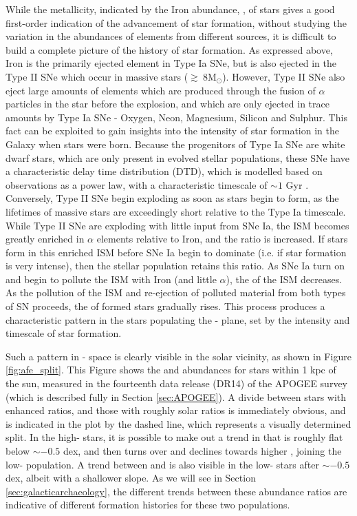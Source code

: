 While the metallicity, indicated by the Iron abundance, \feh{}, of stars gives a good first-order indication of the advancement of star formation, without studying the variation in the abundances of elements from different sources, it is difficult to build a complete picture of the history of star formation. As expressed above, Iron is the primarily ejected element in Type Ia SNe, but is also ejected in the Type II SNe which occur in massive stars ($\gtrsim \ 8 \mathrm{M_{\odot}}$). However, Type II SNe also eject large amounts of elements which are produced through the fusion of $\alpha$ particles in the star before the explosion, and which are only ejected in trace amounts by Type Ia SNe - Oxygen, Neon, Magnesium, Silicon and Sulphur. This fact can be exploited to gain insights into the intensity of star formation in the Galaxy when stars were born. Because the progenitors of Type Ia SNe are white dwarf stars, which are only present in evolved stellar populations, these SNe have a characteristic delay time distribution (DTD), which is modelled based on observations as a power law, with a characteristic timescale of $\sim 1$ Gyr \citep[e.g.][]{2012MNRAS.426.3282M,2014ApJ...783...28G}. Conversely, Type II SNe begin exploding as soon as stars begin to form, as the lifetimes of massive stars are exceedingly short relative to the Type Ia timescale. While Type II SNe are exploding with little input from SNe Ia, the ISM becomes greatly enriched in $\alpha$ elements relative to Iron, and the \afe{} ratio is increased. If stars form in this enriched ISM before SNe Ia begin to dominate (i.e. if star formation is very intense), then the stellar population retains this \afe{} ratio. As SNe Ia turn on and begin to pollute the ISM with Iron (and little $\alpha$), the \afe{} of the ISM decreases. As the pollution of the ISM and re-ejection of polluted material from both types of SN proceeds, the \feh{} of formed stars gradually rises. This process produces a characteristic pattern in the stars populating the \afe{}-\feh{} plane, set by the intensity and timescale of star formation.

Such a pattern in \afe{}-\feh{} space is clearly visible in the solar vicinity, as shown in Figure \ref{fig:afe_split}. This Figure shows the \afe{} and \feh{} abundances for stars within 1 kpc of the sun, measured in the fourteenth data release (DR14) of the APOGEE survey (which is described fully in Section \ref{sec:APOGEE}). A divide between stars with enhanced \afe{} ratios, and those with roughly solar ratios is immediately obvious, and is indicated in the plot by the dashed line, which represents a visually determined split. In the high-\afe{} stars, it is possible to make out a trend in \afe{} that is roughly flat below \feh{}$\sim -0.5$ dex, and then turns over and declines towards higher \feh{}, joining the low-\afe{} population. A trend between \afe{} and \feh{} is also visible in the low-\afe{} stars after \feh{}$\sim -0.5$ dex, albeit with a shallower slope. As we will see in Section \ref{sec:galacticarchaeology}, the different trends between these abundance ratios are indicative of different formation histories for these two populations.

